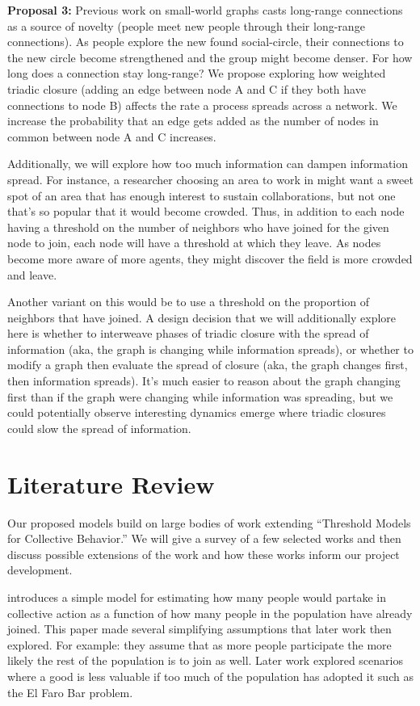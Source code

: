 \textbf{Proposal 3: }Previous work on small-world graphs casts long-range connections as a source of novelty (people meet new people through their long-range connections). As people explore the new found social-circle, their connections to the new circle become strengthened and the group might become denser. For how long does a connection stay long-range? We propose exploring how weighted triadic closure (adding an edge between node A and C if they both have connections to node B) affects the rate a process spreads across a network. We increase the probability that an edge gets added as the number of nodes in common between node A and C increases. 

Additionally, we will explore how too much information can dampen information spread. For instance, a researcher choosing an area to work in might want a sweet spot of an area that has enough interest to sustain collaborations, but not one that’s so popular that it would become crowded. Thus, in addition to each node having a threshold on the number of neighbors who have joined for the given node to join, each node will have a threshold at which they leave. As nodes become more aware of more agents, they might discover the field is more crowded and leave.

Another variant on this would be to use a threshold on the proportion of neighbors that have joined. A design decision that we will additionally explore here is whether to interweave phases of triadic closure with the spread of information (aka, the graph is changing while information spreads), or whether to modify a graph then evaluate the spread of closure (aka, the graph changes first, then information spreads). It’s much easier to reason about the graph changing first than if the graph were changing while information was spreading, but we could potentially observe interesting dynamics emerge where triadic closures could slow the spread of information.

\section{Literature Review}

Our proposed models build on large bodies of work extending “Threshold Models for Collective Behavior.” We will give a survey of a few selected works and then discuss possible extensions of the work and how these works inform our project development. 

\cite{granovetter} introduces a simple model for estimating how many people would partake in collective action as a function of how many people in the population have already joined. This paper made several simplifying assumptions that later work then explored. For example: they assume that as more people participate the more likely the rest of the population is to join as well. Later work explored scenarios where a good is less valuable if too much of the population has adopted it such as the El Faro Bar problem. 

